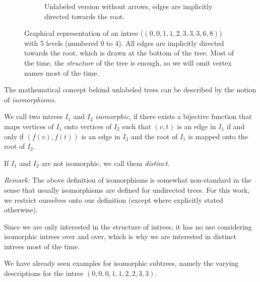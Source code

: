 \begin{figure}[t]
\begin{subfigure}{.45\textwidth}
    \caption{Unlabeled version without arrows, edges are implicitly directed towards the root.}
    \label{fig:intree-example-structure-version}
  \end{subfigure}
  \caption{Graphical representation of an intree ($(0,0,1,1,2,3,3,3,6,8)$) with 5 levels (numbered 0 to 4). All edges are implicitly directed towards the root, which is drawn at the bottom of the tree. Most of the time, the \emph{structure} of the tree is enough, so we will omit vertex names most of the time.}
  \label{fig:intrees-introductory-explanation}
\end{figure}

The mathematical concept behind unlabeled trees can be described by the notion of \emph{isomorphisms}.

\begin{definition}
  We call two intrees $I_1$ and $I_2$ \emph{isomorphic}, if there exists a bijective function that maps vertices of $I_1$ onto vertices of $I_2$ such that $(v,t)$ is an edge in $I_1$ if and only if $(f(v), f(t))$ is an edge in $I_2$ and the root of $I_1$ is mapped onto the root of $I_2$.

  If $I_1$ and $I_2$ are not isomorphic, we call them \emph{distinct}.
\end{definition}

\emph{Remark:} The above definition of isomorphisms is somewhat non-standard in the sense that usually isomorphisms are defined for undirected trees. For this work, we restrict ourselves onto our definition (except where explicitly stated otherwise).

Since we are only interested in the structure of intrees, it has no use considering isomorphic intrees over and over, which is why we are interested in distinct intrees most of the time.

We have already seen examples for isomorphic subtrees, namely the varying descriptions for the intree $(0,0,0,1,1,2,2,3,3)$.

